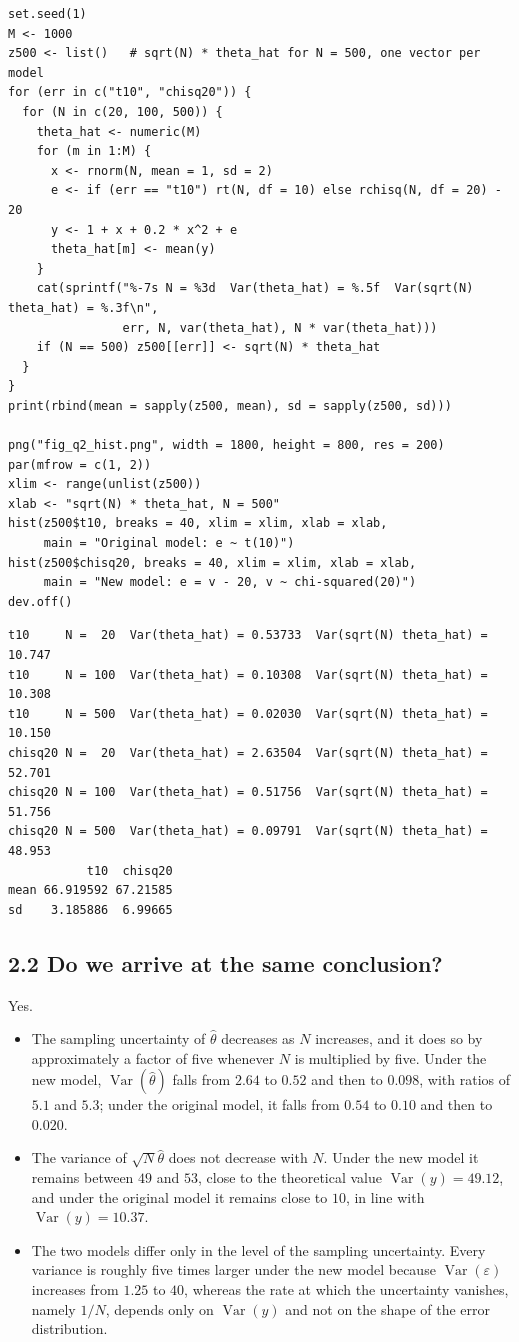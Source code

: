 \documentclass{HW} %
\newcommand{\Var}{\operatorname{Var}}
\begin{document}
\begin{lstlisting}
set.seed(1)
M <- 1000
z500 <- list()   # sqrt(N) * theta_hat for N = 500, one vector per model
for (err in c("t10", "chisq20")) {
  for (N in c(20, 100, 500)) {
    theta_hat <- numeric(M)
    for (m in 1:M) {
      x <- rnorm(N, mean = 1, sd = 2)
      e <- if (err == "t10") rt(N, df = 10) else rchisq(N, df = 20) - 20
      y <- 1 + x + 0.2 * x^2 + e
      theta_hat[m] <- mean(y)
    }
    cat(sprintf("%-7s N = %3d  Var(theta_hat) = %.5f  Var(sqrt(N) theta_hat) = %.3f\n",
                err, N, var(theta_hat), N * var(theta_hat)))
    if (N == 500) z500[[err]] <- sqrt(N) * theta_hat
  }
}
print(rbind(mean = sapply(z500, mean), sd = sapply(z500, sd)))

png("fig_q2_hist.png", width = 1800, height = 800, res = 200)
par(mfrow = c(1, 2))
xlim <- range(unlist(z500))
xlab <- "sqrt(N) * theta_hat, N = 500"
hist(z500$t10, breaks = 40, xlim = xlim, xlab = xlab,
     main = "Original model: e ~ t(10)")
hist(z500$chisq20, breaks = 40, xlim = xlim, xlab = xlab,
     main = "New model: e = v - 20, v ~ chi-squared(20)")
dev.off()
\end{lstlisting}
\begin{lstlisting}[style=routput]
t10     N =  20  Var(theta_hat) = 0.53733  Var(sqrt(N) theta_hat) = 10.747
t10     N = 100  Var(theta_hat) = 0.10308  Var(sqrt(N) theta_hat) = 10.308
t10     N = 500  Var(theta_hat) = 0.02030  Var(sqrt(N) theta_hat) = 10.150
chisq20 N =  20  Var(theta_hat) = 2.63504  Var(sqrt(N) theta_hat) = 52.701
chisq20 N = 100  Var(theta_hat) = 0.51756  Var(sqrt(N) theta_hat) = 51.756
chisq20 N = 500  Var(theta_hat) = 0.09791  Var(sqrt(N) theta_hat) = 48.953
           t10  chisq20
mean 66.919592 67.21585
sd    3.185886  6.99665
\end{lstlisting}

\subsection*{2.2 Do we arrive at the same conclusion?}
Yes.
\begin{itemize}
\item The sampling uncertainty of $\hat\theta$ decreases as $N$ increases, and it does so by approximately a factor of five whenever $N$ is multiplied by five. Under the new model, $\Var(\hat\theta)$ falls from $2.64$ to $0.52$ and then to $0.098$, with ratios of $5.1$ and $5.3$; under the original model, it falls from $0.54$ to $0.10$ and then to $0.020$.
\item The variance of $\sqrt{N}\hat\theta$ does not decrease with $N$. Under the new model it remains between $49$ and $53$, close to the theoretical value $\Var(y) = 49.12$, and under the original model it remains close to $10$, in line with $\Var(y) = 10.37$.
\item The two models differ only in the level of the sampling uncertainty. Every variance is roughly five times larger under the new model because $\Var(\varepsilon)$ increases from $1.25$ to $40$, whereas the rate at which the uncertainty vanishes, namely $1/N$, depends only on $\Var(y)$ and not on the shape of the error distribution.
\end{itemize}
\end{document}
